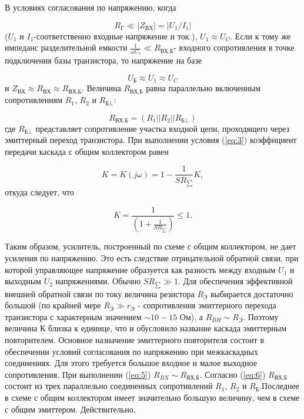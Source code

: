 В условиях согласования по напряжению, когда

$$R_{\text{Г}} \ll |Z_{\text{ВХ}}|=|U_1/I_1|$$
($U_1$ и $I_1$-соответственно входные напряжение и ток ), $U_1 \approx U_C$. Если
к тому же импеданс разделительной емкости $\frac{1}{\omega C_1}\ll R_{\text{ВХ.Б}}$- входного сопротивления в точке подключения базы транзистора, то напряжение на базе

\begin{equation}
	U_{\text{Б}} \approx U_1 \approx U_C
	\label{eq:5}
\end{equation}
и $Z_{\text{ВХ}} \approx R_{\text{ВХ}} \approx R_{\text{ВХ.Б}}$. Величина $R_{\text{ВХ.Б}}$ равна параллельно включенным сопротивлениям $R_1$, $R_2$ и $R_{\text{Б} \bot}$:

\begin{equation}
	R_{\text{ВХ.Б}}=(R_1||R_2||R_{\text{Б} \bot})
	\label{eq:6}
\end{equation}
где $R_{\text{Б} \bot}$ представляет сопротивление участка входной цепи, проходящего через эмиттерный переход транзистора. При выполнении условия (\ref{eq:3}) коэффициент передачи каскада с общим коллектором равен 

$$K=K(j\omega)=1-\frac{1}{SR_{\sum}}K,$$
откуда следует, что

$$K=\frac{1}{(1+\frac{1}{SR_{\sum}})}\leq 1.$$

Таким образом, усилитель, построенный по схеме с общим коллектором, не дает усиления по напряжению. Это есть следствие отрицательной обратной связи, при которой управляющее
напряжение образуется как разность между входным $U_1$ и выходным $U_2$ напряжениями. Обычно $SR_{\sum}\gg1$. Для обеспечения эффективной внешней обратной связи по току величина резистора $R_{\text{Э}}$ выбирается достаточно большой (по крайней мере $R_{\text{Э}} \gg r_{\text{Э}}$ - сопротивления эмиттерного перехода транзистора с характерным значением $\sim 10-15$ Ом), а $R_{BH} \sim R_{\text{Э}}$. Поэтому величина К близка к единице, что и обусловило название каскада эмиттерным повторителем. Основное назначение эмиттерного повторителя состоит в обеспечении условий согласования по напряжению при межкаскадных соединениях. Для этого требуется большое входное и малое выходное сопротивления. При выполнении (\ref{eq:5}) $R_{BX} \sim R_{\text{ВХ.Б}}$. Согласно (\ref{eq:6})  $R_{\text{ВХ.Б}}$ состоит из трех параллельно соединенных сопротивлений $R_1$, $R_2$ и $R_{\text{Б}}$.Последнее в схеме с общим коллектором имеет значительно большую величину, чем в схеме с общим эмиттером. Действительно,

